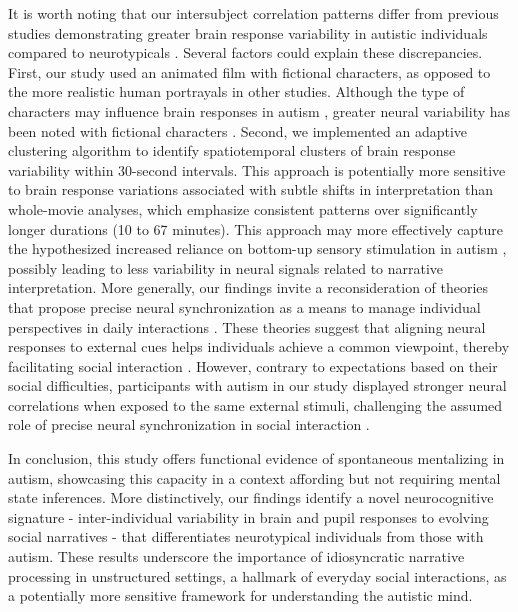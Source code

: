It is worth noting that our intersubject correlation patterns differ from previous studies demonstrating greater brain response variability in autistic individuals compared to neurotypicals \citep{byrge2015,hahamy2015,hasson2009,lyons2020,nunes2019,ou2022,pegado2020,salmi2013}. Several factors could explain these discrepancies. First, our study used an animated film with fictional characters, as opposed to the more realistic human portrayals in other studies. Although the type of characters may influence brain responses in autism \citep{atherton2018}, greater neural variability has been noted with fictional characters \citep{lyons2020}. Second, we implemented an adaptive clustering algorithm to identify spatiotemporal clusters of brain response variability within 30-second intervals. This approach is potentially more sensitive to brain response variations associated with subtle shifts in interpretation than whole-movie analyses, which emphasize consistent patterns over significantly longer durations (10 to 67 minutes). This approach may more effectively capture the hypothesized increased reliance on bottom-up sensory stimulation in autism \citep{pellicano2012}, possibly leading to less variability in neural signals related to narrative interpretation. More generally, our findings invite a reconsideration of theories that propose precise neural synchronization as a means to manage individual perspectives in daily interactions \citep{holroyd2022}. These theories suggest that aligning neural responses to external cues helps individuals achieve a common viewpoint, thereby facilitating social interaction \citep{hasson2012,mayo2021}. However, contrary to expectations based on their social difficulties, participants with autism in our study displayed stronger neural correlations when exposed to the same external stimuli, challenging the assumed role of precise neural synchronization in social interaction \citep{stolk2014}.

In conclusion, this study offers functional evidence of spontaneous mentalizing in autism, showcasing this capacity in a context affording but not requiring mental state inferences. More distinctively, our findings identify a novel neurocognitive signature - inter-individual variability in brain and pupil responses to evolving social narratives - that differentiates neurotypical individuals from those with autism. These results underscore the importance of idiosyncratic narrative processing in unstructured settings, a hallmark of everyday social interactions, as a potentially more sensitive framework for understanding the autistic mind.
\newpage
